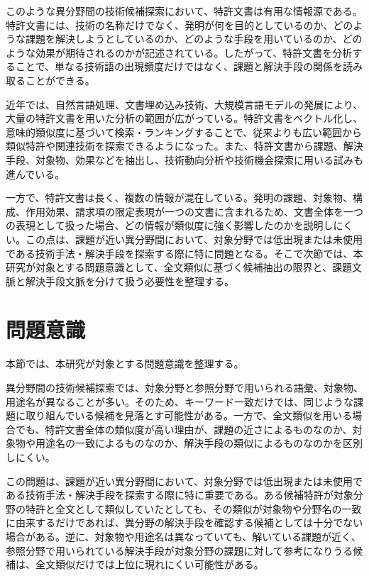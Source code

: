 このような異分野間の技術候補探索において、特許文書は有用な情報源である。特許文書には、技術の名称だけでなく、発明が何を目的としているのか、どのような課題を解決しようとしているのか、どのような手段を用いているのか、どのような効果が期待されるのかが記述されている。したがって、特許文書を分析することで、単なる技術語の出現頻度だけではなく、課題と解決手段の関係を読み取ることができる。

近年では、自然言語処理、文書埋め込み技術、大規模言語モデルの発展により、大量の特許文書を用いた分析の範囲が広がっている。特許文書をベクトル化し、意味的類似度に基づいて検索・ランキングすることで、従来よりも広い範囲から類似特許や関連技術を探索できるようになった。また、特許文書から課題、解決手段、対象物、効果などを抽出し、技術動向分析や技術機会探索に用いる試みも進んでいる。

一方で、特許文書は長く、複数の情報が混在している。発明の課題、対象物、構成、作用効果、請求項の限定表現が一つの文書に含まれるため、文書全体を一つの表現として扱った場合、どの情報が類似度に強く影響したのかを説明しにくい。この点は、課題が近い異分野間において、対象分野では低出現または未使用である技術手法・解決手段を探索する際に特に問題となる。そこで次節では、本研究が対象とする問題意識として、全文類似に基づく候補抽出の限界と、課題文脈と解決手段文脈を分けて扱う必要性を整理する。

\section{問題意識}

本節では、本研究が対象とする問題意識を整理する。

異分野間の技術候補探索では、対象分野と参照分野で用いられる語彙、対象物、用途名が異なることが多い。そのため、キーワード一致だけでは、同じような課題に取り組んでいる候補を見落とす可能性がある。一方で、全文類似を用いる場合でも、特許文書全体の類似度が高い理由が、課題の近さによるものなのか、対象物や用途名の一致によるものなのか、解決手段の類似によるものなのかを区別しにくい。

この問題は、課題が近い異分野間において、対象分野では低出現または未使用である技術手法・解決手段を探索する際に特に重要である。ある候補特許が対象分野の特許と全文として類似していたとしても、その類似が対象物や分野名の一致に由来するだけであれば、異分野の解決手段を確認する候補としては十分でない場合がある。逆に、対象物や用途名は異なっていても、解いている課題が近く、参照分野で用いられている解決手段が対象分野の課題に対して参考になりうる候補は、全文類似だけでは上位に現れにくい可能性がある。

